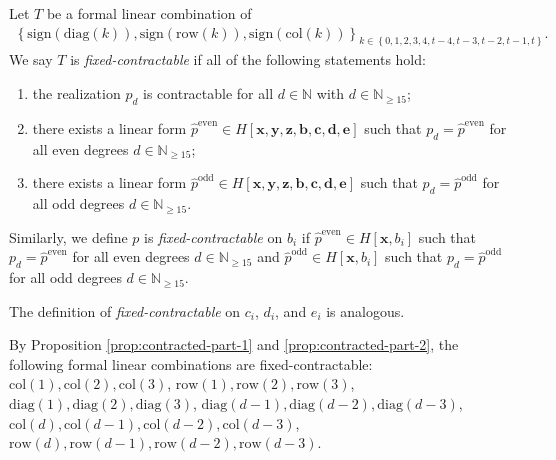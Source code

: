 \begin{definition}
    Let \( T \) be a formal linear combination of
    \begin{align*}
        \left\{ \mathrm{sign}(\mathrm{diag}(k)), \mathrm{sign}(\mathrm{row}(k)), \mathrm{sign}(\mathrm{col}(k)) \right\}_{k \in \left\{ 0,1,2,3,4,t-4,t-3,t-2,t-1,t \right\}}.
    \end{align*}
    We say \( T \) is \emph{fixed-contractable} if all of the following statements hold:
    \begin{enumerate}
        \item the realization \( p_d \) is contractable for all \( d \in \mathbb{N} \) with \( d \in \mathbb{N}_{\geq 15} \);
        \item there exists a linear form \( \hat p^{\mathrm{even}} \in H[\mathbf{x}, \mathbf{y}, \mathbf{z}, \mathbf{b}, \mathbf{c}, \mathbf{d}, \mathbf{e}] \) such that \( p_d = \hat p^{\mathrm{even}} \) for all even degrees \(  d \in \mathbb{N}_{\geq 15}  \);
        \item there exists a linear form \( \hat p^{\mathrm{odd}} \in H[\mathbf{x}, \mathbf{y}, \mathbf{z}, \mathbf{b}, \mathbf{c}, \mathbf{d}, \mathbf{e}] \) such that \( p_d = \hat p^{\mathrm{odd}} \) for all odd degrees \(  d \in \mathbb{N}_{\geq 15}  \).
    \end{enumerate}
    
    Similarly, we define \( p \) is \emph{fixed-contractable} on \( b_i \) if \( \hat p^{\mathrm{even}} \in H[\mathbf{x}, b_i] \) such that \( p_d = \hat p^{\mathrm{even}} \) for all even degrees \(  d \in \mathbb{N}_{\geq 15}  \) and \( \hat p^{\mathrm{odd}} \in H[\mathbf{x}, b_i] \) such that \( p_d = \hat p^{\mathrm{odd}} \) for all odd degrees \(  d \in \mathbb{N}_{\geq 15}  \). 
    
    The definition of \emph{fixed-contractable} on \( c_i \), \( d_i \), and \( e_i \) is analogous.
\end{definition}

\begin{example}
    By Proposition \ref{prop:contracted-part-1} and \ref{prop:contracted-part-2}, the following formal linear combinations are fixed-contractable: \( \mathrm{col}(1), \mathrm{col}(2), \mathrm{col}(3) \), \(  \mathrm{row}(1), \mathrm{row}(2), \mathrm{row}(3) \), \( \mathrm{diag}(1), \mathrm{diag}(2), \mathrm{diag}(3) \), \( \mathrm{diag}(d-1), \mathrm{diag}(d-2), \mathrm{diag}(d-3) \), \( \mathrm{col}(d), \mathrm{col}(d-1), \mathrm{col}(d-2), \mathrm{col}(d-3) \), \( \mathrm{row}(d), \mathrm{row}(d-1), \mathrm{row}(d-2), \mathrm{row}(d-3) \).
\end{example}

